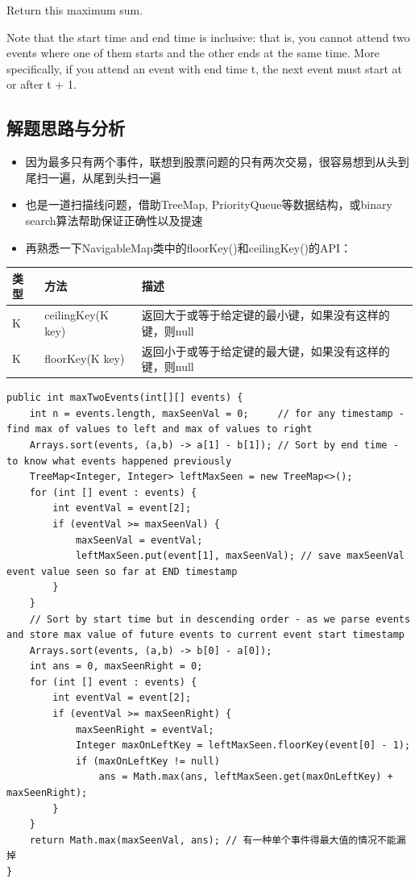 \documentclass[9pt, b5paaper]{book}
\begin{document}
Return this maximum sum.

Note that the start time and end time is inclusive: that is, you cannot attend two events where one of them starts and the other ends at the same time. More specifically, if you attend an event with end time t, the next event must start at or after t + 1.
\subsection{解题思路与分析}
\label{sec-8-1-1}
\begin{itemize}
\item 因为最多只有两个事件，联想到股票问题的只有两次交易，很容易想到从头到尾扫一遍，从尾到头扫一遍
\item 也是一道扫描线问题，借助TreeMap, PriorityQueue等数据结构，或binary search算法帮助保证正确性以及提速
\item 再熟悉一下NavigableMap类中的floorKey()和ceilingKey()的API：
\end{itemize}
\begin{center}
\begin{tabular}{lll}
\hline
类型 & 方法 & 描述\\
\hline
K & ceilingKey(K key) & 返回大于或等于给定键的最小键，如果没有这样的键，则null\\
K & floorKey(K key) & 返回小于或等于给定键的最大键，如果没有这样的键，则null\\
\hline
\end{tabular}
\end{center}
\begin{verbatim}
public int maxTwoEvents(int[][] events) {  
    int n = events.length, maxSeenVal = 0;     // for any timestamp - find max of values to left and max of values to right
    Arrays.sort(events, (a,b) -> a[1] - b[1]); // Sort by end time - to know what events happened previously
    TreeMap<Integer, Integer> leftMaxSeen = new TreeMap<>();
    for (int [] event : events) {
        int eventVal = event[2];
        if (eventVal >= maxSeenVal) {
            maxSeenVal = eventVal;
            leftMaxSeen.put(event[1], maxSeenVal); // save maxSeenVal event value seen so far at END timestamp
        }
    }
    // Sort by start time but in descending order - as we parse events and store max value of future events to current event start timestamp
    Arrays.sort(events, (a,b) -> b[0] - a[0]);
    int ans = 0, maxSeenRight = 0;
    for (int [] event : events) {
        int eventVal = event[2];
        if (eventVal >= maxSeenRight) {
            maxSeenRight = eventVal;
            Integer maxOnLeftKey = leftMaxSeen.floorKey(event[0] - 1);
            if (maxOnLeftKey != null)
                ans = Math.max(ans, leftMaxSeen.get(maxOnLeftKey) + maxSeenRight);
        }
    }
    return Math.max(maxSeenVal, ans); // 有一种单个事件得最大值的情况不能漏掉
}
\end{verbatim}
\end{document}
